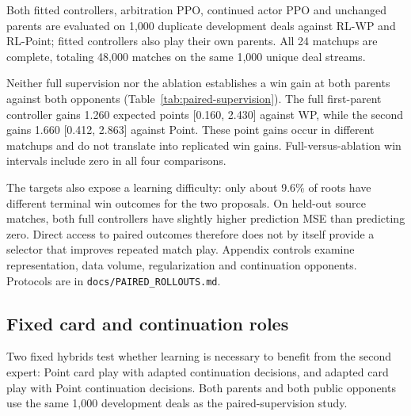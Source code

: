 \documentclass[11pt]{article}
\begin{document}
\begin{table}[ht]
\centering\small

\caption{Paired-supervision win-score changes relative to each unchanged
parent, in percentage points. Intervals bootstrap 1,000 shared duplicate deals.
The ablation removes explicit score and round inputs.}
\label{tab:paired-supervision}
\end{table}

Both fitted controllers, arbitration PPO, continued actor PPO and unchanged
parents are evaluated on 1,000 duplicate development deals against RL-WP and
RL-Point; fitted controllers also play their own parents. All 24 matchups are
complete, totaling 48,000 matches on the same 1,000 unique deal streams.



Neither full supervision nor the ablation establishes a win gain at both
parents against both opponents (Table~\ref{tab:paired-supervision}). The full
first-parent controller gains 1.260 expected points [0.160, 2.430] against WP,
while the second gains 1.660 [0.412, 2.863] against Point. These point gains
occur in different matchups and do not translate into replicated win gains.
Full-versus-ablation win intervals include zero in all four comparisons.

The targets also expose a learning difficulty: only about 9.6\% of roots
have different terminal win outcomes for the two proposals. On held-out
source matches, both full controllers have slightly higher prediction MSE
than predicting zero. Direct access to paired outcomes therefore does not by
itself provide a selector that improves repeated match play. Appendix controls
examine representation, data volume, regularization and continuation opponents.
Protocols are in \texttt{docs/PAIRED\_ROLLOUTS.md}.

\subsection{Fixed card and continuation roles}
Two fixed hybrids test whether learning is necessary to benefit from the second
expert: Point card play with adapted continuation decisions, and adapted card
play with Point continuation decisions. Both parents and both public opponents
use the same 1,000 development deals as the paired-supervision study.

\begin{table}[ht]
\centering\small

\caption{Using RL-Point only for stop/continue decisions: paired changes from
the unchanged adapted parent on 1,000 shared duplicate deals. Point margin is
final candidate score minus opponent score.}
\label{tab:static-koi}
\end{table}
\end{document}
